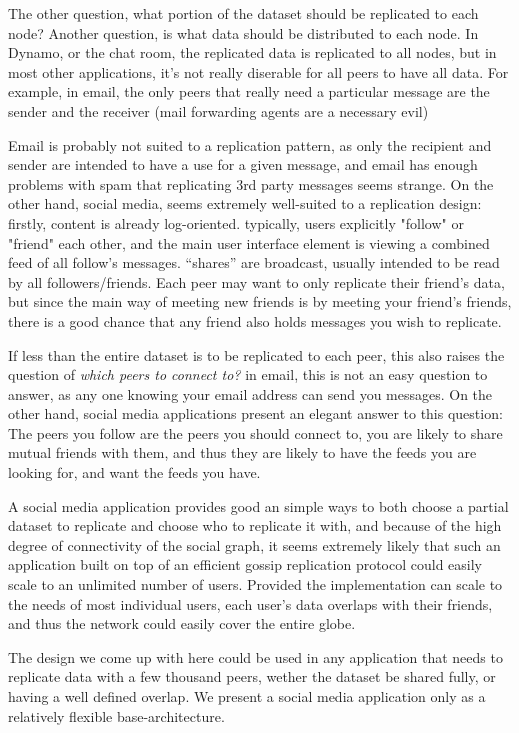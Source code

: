 \documentclass[sigconf]{acmart}
\begin{document}
The other question, what portion of the dataset should be replicated
to each node? Another question, is what data should be distributed to
each node.  In Dynamo, or the chat room, the replicated data is
replicated to all nodes, but in most other applications, it's not
really diserable for all peers to have all data. For example, in
email, the only peers that really need a particular message are the
sender and the receiver (mail forwarding agents are a necessary evil)

Email is probably not suited to a replication pattern, as only the
recipient and sender are intended to have a use for a given message,
and email has enough problems with spam that replicating 3rd party
messages seems strange. On the other hand, social media, seems
extremely well-suited to a replication design: firstly, content is
already log-oriented. typically, users explicitly "follow" or "friend"
each other, and the main user interface element is viewing a combined
feed of all follow's messages. ``shares'' are broadcast, usually
intended to be read by all followers/friends.  Each peer may want to
only replicate their friend's data, but since the main way of meeting
new friends is by meeting your friend's friends, there is a good
chance that any friend also holds messages you wish to replicate.

If less than the entire dataset is to be replicated to each peer, this
also raises the question of {\em which peers to connect to?}  in
email, this is not an easy question to answer, as any one knowing your
email address can send you messages. On the other hand, social media
applications present an elegant answer to this question: The peers you
follow are the peers you should connect to, you are likely to share
mutual friends with them, and thus they are likely to have the feeds
you are looking for, and want the feeds you have.

A social media application provides good an simple ways to both choose
a partial dataset to replicate and choose who to replicate it with,
and because of the high degree of connectivity of the social graph, it
seems extremely likely that such an application built on top of an
efficient gossip replication protocol could easily scale to an
unlimited number of users. Provided the implementation can scale to
the needs of most individual users, each user's data overlaps with
their friends, and thus the network could easily cover the entire
globe.

The design we come up with here could be used in any application that
needs to replicate data with a few thousand peers, wether the dataset
be shared fully, or having a well defined overlap.  We present a
social media application only as a relatively flexible
base-architecture.
\end{document}
